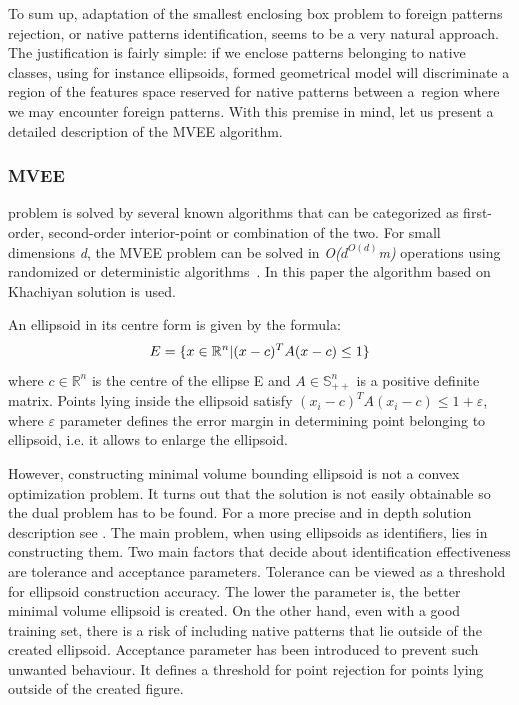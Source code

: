 \documentclass{llncs}
\begin{document}
To sum up, adaptation of the smallest enclosing box problem to foreign patterns rejection, or native patterns identification, seems to be a very natural approach. The justification is fairly simple: if we enclose patterns belonging to native classes, using for instance ellipsoids, formed geometrical model will discriminate a region of the features space reserved for native patterns between a~region where we may encounter foreign patterns. With this premise in mind, let us present a detailed description of the MVEE algorithm.

\vspace{-9pt}
\subsubsection{MVEE}

problem is solved by several known algorithms that can be categorized as first-order, second-order interior-point or combination of the two. For small dimensions \textit{d}, the MVEE problem can be solved in \textit{O($d^{O(d)}$m)} operations using randomized or deterministic algorithms~\cite{MVEEMichaelTodd2005}. In this paper the algorithm based on Khachiyan solution is used.

An ellipsoid in its centre form is given by the formula:
\vspace{-6pt} 
\[ 
  \vspace{-3pt}
  E = \{x \in \mathbb{R}^{n} | (x - c)^{T}A(x-c) \le 1\} 
  \vspace{-3pt}
\] 
where $c \in \mathbb{R}^{n}$ is the centre of the ellipse E and $ A \in \mathbb{S}^{n}_{++}$ is a positive definite matrix. Points lying inside the ellipsoid satisfy $(x_{i} - c)^{T}A(x_{i} - c) \le 1 + \varepsilon$, where $\varepsilon$ parameter defines the error margin in determining point belonging to ellipsoid, i.e. it allows to enlarge the ellipsoid.%

However, constructing minimal volume bounding ellipsoid is not a convex optimization problem. It turns out that the solution is not easily obtainable so the dual problem has to be found. For a more precise and in depth solution description see \cite{MVEEMichaelTodd2005}. The main problem, when using ellipsoids as identifiers, lies in constructing them. Two main factors that decide about identification effectiveness are tolerance and acceptance parameters. Tolerance can be viewed as a threshold for ellipsoid construction accuracy. The lower the parameter is, the better minimal volume ellipsoid is created. On the other hand, even with a good training set, there is a risk of including native patterns that lie outside of the created ellipsoid. Acceptance parameter has been introduced to prevent such unwanted behaviour. It defines a threshold for point rejection for points lying outside of the created figure.  
\end{document}
